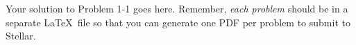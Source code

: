 \documentclass{6046}
\author{Ben Bitdiddle}
\begin{document}
Your solution to Problem 1-1 goes here. Remember, \emph{each problem} should be
in a separate \LaTeX\ file so that you can generate one PDF per problem to
submit to Stellar.
\end{document}
